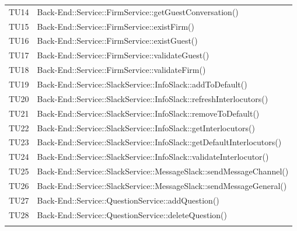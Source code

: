 \documentclass[../PianoDiQualifica_v3.0.0.tex]{subfiles}
\begin{document}
\begin{longtable}[c] { >{\centering\arraybackslash}p{} >{\centering\arraybackslash}p{}}
			\addlinespace[0.3em]
			\midrule
			\addlinespace[0.3em]
			TU14 & Back-End::Service::FirmService::getGuestConversation() \\
			\addlinespace[0.3em]
			\midrule
			\addlinespace[0.3em]
			TU15 & Back-End::Service::FirmService::existFirm() \\
			\addlinespace[0.3em]
			\midrule
			\addlinespace[0.3em]
			TU16 & Back-End::Service::FirmService::existGuest() \\
			\addlinespace[0.3em]
			\midrule
			\addlinespace[0.3em]
			TU17 & Back-End::Service::FirmService::validateGuest() \\
			\addlinespace[0.3em]
			\midrule
			\addlinespace[0.3em]
			TU18 & Back-End::Service::FirmService::validateFirm() \\
			\addlinespace[0.3em]
			\midrule
			\addlinespace[0.3em]
			TU19 & Back-End::Service::SlackService::InfoSlack::addToDefault() \\
			\addlinespace[0.3em]
			\midrule
			\addlinespace[0.3em]
			TU20 & Back-End::Service::SlackService::InfoSlack::refreshInterlocutors() \\
			\addlinespace[0.3em]
			\midrule
			\addlinespace[0.3em]
			TU21 & Back-End::Service::SlackService::InfoSlack::removeToDefault() \\
			\addlinespace[0.3em]
			\midrule
			\addlinespace[0.3em]
			TU22 & Back-End::Service::SlackService::InfoSlack::getInterlocutors() \\
			\addlinespace[0.3em]
			\midrule
			\addlinespace[0.3em]
			TU23 & Back-End::Service::SlackService::InfoSlack::getDefaultInterlocutors() \\
			\addlinespace[0.3em]
			\midrule
			\addlinespace[0.3em]
			TU24 & Back-End::Service::SlackService::InfoSlack::validateInterlocutor() \\
			\addlinespace[0.3em]
			\midrule
			\addlinespace[0.3em]
			TU25 & Back-End::Service::SlackService::MessageSlack::sendMessageChannel() \\
			\addlinespace[0.3em]
			\midrule
			\addlinespace[0.3em]
			TU26 & Back-End::Service::SlackService::MessageSlack::sendMessageGeneral() \\
			\addlinespace[0.3em]
			\midrule
			\addlinespace[0.3em]
			TU27 & Back-End::Service::QuestionService::addQuestion() \\
			\addlinespace[0.3em]
			\midrule
			\addlinespace[0.3em]
			TU28 & Back-End::Service::QuestionService::deleteQuestion() \\
			\addlinespace[0.3em]
			\midrule
			\addlinespace[0.3em]

\end{longtable}
\end{document}
